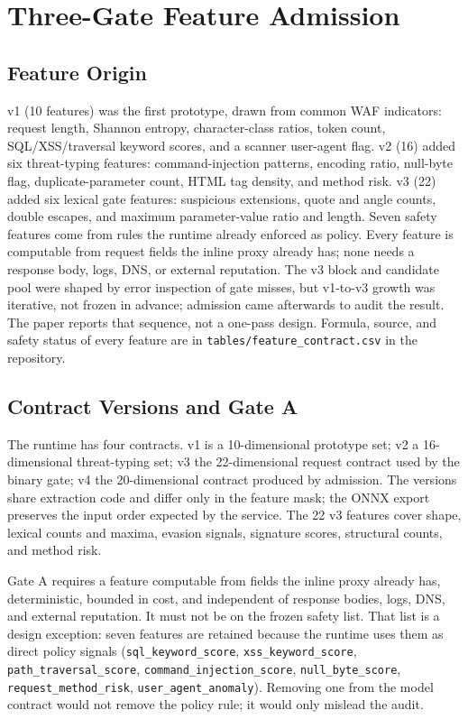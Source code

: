 \documentclass[conference]{IEEEtran}
\newcommand{\feat}[1]{\texttt{#1}}
\begin{document}
\section{Three-Gate Feature Admission}
\subsection{Feature Origin}
v1 (10 features) was the first prototype, drawn from common WAF indicators: request length, Shannon entropy, character-class ratios, token count, SQL/XSS/traversal keyword scores, and a scanner user-agent flag. v2 (16) added six threat-typing features: command-injection patterns, encoding ratio, null-byte flag, duplicate-parameter count, HTML tag density, and method risk. v3 (22) added six lexical gate features: suspicious extensions, quote and angle counts, double escapes, and maximum parameter-value ratio and length. Seven safety features come from rules the runtime already enforced as policy. Every feature is computable from request fields the inline proxy already has; none needs a response body, logs, DNS, or external reputation. The v3 block and candidate pool were shaped by error inspection of gate misses, but v1-to-v3 growth was iterative, not frozen in advance; admission came afterwards to audit the result. The paper reports that sequence, not a one-pass design. Formula, source, and safety status of every feature are in \texttt{tables/feature\_contract.csv} in the repository.

\subsection{Contract Versions and Gate A}
The runtime has four contracts. v1 is a 10-dimensional prototype set; v2 a 16-dimensional threat-typing set; v3 the 22-dimensional request contract used by the binary gate; v4 the 20-dimensional contract produced by admission. The versions share extraction code and differ only in the feature mask; the ONNX export preserves the input order expected by the service. The 22 v3 features cover shape, lexical counts and maxima, evasion signals, signature scores, structural counts, and method risk.

Gate A requires a feature computable from fields the inline proxy already has, deterministic, bounded in cost, and independent of response bodies, logs, DNS, and external reputation. It must not be on the frozen safety list. That list is a design exception: seven features are retained because the runtime uses them as direct policy signals (\feat{sql\_keyword\_score}, \feat{xss\_keyword\_score}, \feat{path\_traversal\_score}, \feat{command\_injection\_score}, \feat{null\_byte\_score}, \feat{request\_method\_risk}, \feat{user\_agent\_anomaly}). Removing one from the model contract would not remove the policy rule; it would only mislead the audit.
\end{document}

